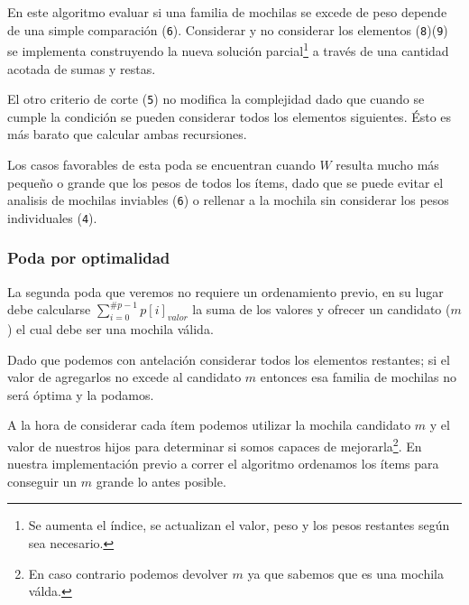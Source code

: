 \documentclass[fleqn, 11pt]{article}
\begin{document}
En este algoritmo evaluar si una familia de mochilas se excede de peso depende
de una simple comparación (\texttt{6}). Considerar y no considerar los
elementos (\texttt{8})(\texttt{9}) se implementa construyendo la nueva solución
parcial\footnote{Se aumenta el índice, se actualizan el valor, peso y los pesos
restantes según sea necesario.} a través de una cantidad acotada de sumas y
restas.

El otro criterio de corte (\texttt{5}) no modifica la complejidad dado que
cuando se cumple la condición se pueden considerar todos los elementos
siguientes. Ésto es más barato que calcular ambas recursiones.

Los casos favorables de esta poda se encuentran cuando $W$ resulta mucho más
pequeño o grande que los pesos de todos los ítems, dado que se puede evitar el
analisis de mochilas inviables (\texttt{6}) o rellenar a la mochila sin
considerar los pesos individuales (\texttt{4}).

\subsubsection{Poda por optimalidad}

La segunda poda que veremos no requiere un ordenamiento previo, en su lugar
debe calcularse $\sum_{i = 0}^{\#p - 1}p[i]_{valor}$ la suma de los valores y
ofrecer un candidato ($m$) el cual debe ser una mochila válida.

Dado que podemos con antelación considerar todos los elementos restantes; si el
valor de agregarlos no excede al candidato $m$ entonces esa familia de mochilas
no será óptima y la podamos.

A la hora de considerar cada ítem podemos utilizar la mochila candidato $m$ y
el valor de nuestros hijos para determinar si somos capaces de
mejorarla\footnote{En caso contrario podemos devolver $m$ ya que sabemos que es
una mochila válda.}. En nuestra implementación previo a correr el algoritmo
ordenamos los ítems para conseguir un $m$ grande lo antes posible.

\clearpage
\end{document}
